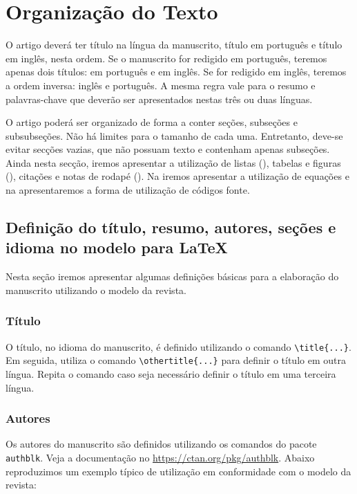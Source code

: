 \documentclass[portuguese]{textolivre}
\begin{document}
\section{Organização do Texto}\label{sec-organizacao}
O artigo deverá ter título na língua da manuscrito, título em português e título em inglês, nesta ordem.
Se o manuscrito for redigido em português, teremos apenas dois títulos: em português e em inglês.
Se for redigido em inglês, teremos a ordem inversa: inglês e português.
A mesma regra vale para o resumo e palavras-chave que deverão ser apresentados nestas três ou duas línguas.

O artigo poderá ser organizado de forma a conter seções, subseções e subsubseções.
Não há limites para o tamanho de cada uma. Entretanto, deve-se evitar secções vazias, que não possuam texto e contenham apenas subseções.
Ainda nesta secção, iremos apresentar a utilização de listas (),
tabelas e figuras (), citações e notas de rodapé ().
Na  iremos apresentar a utilização de equações e na 
apresentaremos a forma de utilização de códigos fonte.

\lipsum[5]

\subsection{Definição do título, resumo, autores, seções e idioma no modelo para \LaTeX{}}\label{sec-organizacao-latex}
Nesta seção iremos apresentar algumas definições básicas para a elaboração do manuscrito utilizando
o modelo da revista.

\subsubsection{Título}\label{sec-titulo}
O título, no idioma do manuscrito, é definido utilizando o comando \verb|\title{...}|. Em seguida,
utiliza o comando \verb|\othertitle{...}| para definir o título em outra língua. Repita o comando
caso seja necessário definir o título em uma terceira língua.

\subsubsection{Autores}\label{sec-autores}
Os autores do manuscrito são definidos utilizando os comandos do pacote \verb|authblk|.
Veja a documentação no \href{CTAN}{https://ctan.org/pkg/authblk}. Abaixo reproduzimos um exemplo típico de utilização
em conformidade com o modelo da revista:
\end{document}
